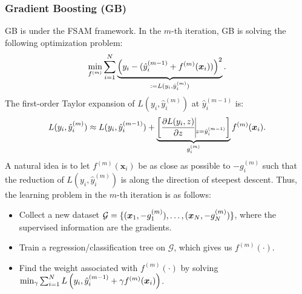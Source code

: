         
        
        
\subsubsection{Gradient Boosting (GB)}
        GB is under the FSAM framework.
        In the $m$-th iteration, GB is solving the following optimization problem:
            \begin{equation}\label{XGBoost-model}
                \min_{f^{(m)}} \sum_{i=1}^{N}{
                    \underbrace{\left( y_i - (\hat{y}^{(m-1)}_i + f^{(m)}(\bm{x}_i)) \right)^2}_{:=L(y_i, \hat{y}_i^{(m)}) }.
                }
            \end{equation}
        The first-order Taylor expansion of $L(y_i, \hat{y}_i^{(m)})$ at $\hat{y}_i^{(m-1)}$ is:
            \begin{equation}
                L(y_i, \hat{y}_i^{(m)}) \approx L(y_i, \hat{y}_i^{(m-1)}) + \underbrace{\left[ \frac{\partial L(y_i, z)}{\partial z}\vline_{z = \hat{y}_i^{(m-1)}} \right]}_{g_{i}^{(m)}}  f^{(m)}(\bm{x}_i).
            \end{equation}
        A natural idea is to let $f^{(m)}(\bm{x}_i)$ be as close as possible to $-g^{(m)}_i$ such that the reduction of $L(y_i, \hat{y}_i^{(m)})$ is along the direction of steepest descent.
        Thus, the learning problem  in the $m$-th iteration is as follows:
            \begin{itemize}
                \item  Collect a new dataset $\mathcal{G}=\{ (\bm{x}_1, -g^{(m)}_1), \ldots, (\bm{x}_N, -g^{(m)}_N) \}$, where the supervised information are the gradients.
                \item  Train a regression/classification tree on $\mathcal{G}$, which gives us $f^{(m)}(\cdot)$. 
                \item  Find the weight associated with $f^{(m)}(\cdot)$ by solving $\min_{\gamma} \sum_{i=1}^{N}{L\left(y_i, \hat{y}_i^{(m-1)} + \gamma f^{(m)}(\bm{x}_i)\right)}$.
            \end{itemize}


